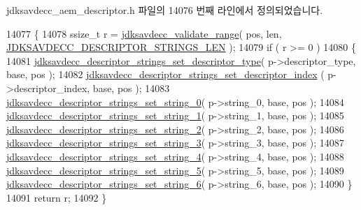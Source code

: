 jdksavdecc\+\_\+aem\+\_\+descriptor.\+h 파일의 14076 번째 라인에서 정의되었습니다.


\begin{DoxyCode}
14077 \{
14078     ssize\_t r = \hyperlink{group__util_ga9c02bdfe76c69163647c3196db7a73a1}{jdksavdecc\_validate\_range}( pos, len, 
      \hyperlink{group__descriptor__strings_ga1a0c88a9f0306c420ea4d28e147f400e}{JDKSAVDECC\_DESCRIPTOR\_STRINGS\_LEN} );
14079     \textcolor{keywordflow}{if} ( r >= 0 )
14080     \{
14081         \hyperlink{group__descriptor__strings_gafcdbc526ad49d09b4f56b533fbac4694}{jdksavdecc\_descriptor\_strings\_set\_descriptor\_type}(
       p->descriptor\_type, base, pos );
14082         \hyperlink{group__descriptor__strings_ga63342f037d1d64c1422073fe797ff7d8}{jdksavdecc\_descriptor\_strings\_set\_descriptor\_index}
      ( p->descriptor\_index, base, pos );
14083         \hyperlink{group__descriptor__strings_ga612bb2728d694ba394037a3dfe518213}{jdksavdecc\_descriptor\_strings\_set\_string\_0}( p->string\_0, 
      base, pos );
14084         \hyperlink{group__descriptor__strings_gaac88d1eee314e285a26b63938d55bc2a}{jdksavdecc\_descriptor\_strings\_set\_string\_1}( p->string\_1, 
      base, pos );
14085         \hyperlink{group__descriptor__strings_ga15417881f32d11bb72284538e642b800}{jdksavdecc\_descriptor\_strings\_set\_string\_2}( p->string\_2, 
      base, pos );
14086         \hyperlink{group__descriptor__strings_gab584eb48dcb1364652f3e352a6e9e2b6}{jdksavdecc\_descriptor\_strings\_set\_string\_3}( p->string\_3, 
      base, pos );
14087         \hyperlink{group__descriptor__strings_gaa41941929c1f067fbfd329907a467bb0}{jdksavdecc\_descriptor\_strings\_set\_string\_4}( p->string\_4, 
      base, pos );
14088         \hyperlink{group__descriptor__strings_ga070e5daf362847b1d6a662d24c071d52}{jdksavdecc\_descriptor\_strings\_set\_string\_5}( p->string\_5, 
      base, pos );
14089         \hyperlink{group__descriptor__strings_gac778e6d58f23f864f9d0b00bdc25e4f9}{jdksavdecc\_descriptor\_strings\_set\_string\_6}( p->string\_6, 
      base, pos );
14090     \}
14091     \textcolor{keywordflow}{return} r;
14092 \}
\end{DoxyCode}


